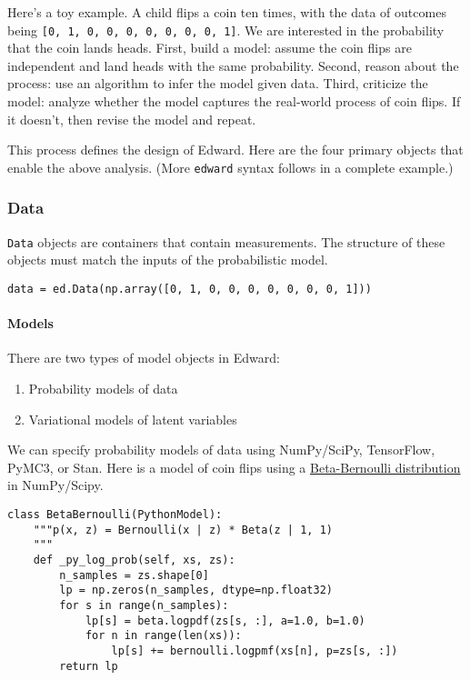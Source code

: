 Here's a toy example. A child flips a coin ten times, with the data of
outcomes being \texttt{{[}0,\ 1,\ 0,\ 0,\ 0,\ 0,\ 0,\ 0,\ 0,\ 1{]}}. We
are interested in the probability that the coin lands heads. First,
build a model: assume the coin flips are independent and land heads with
the same probability. Second, reason about the process: use an algorithm
to infer the model given data. Third, criticize the model: analyze
whether the model captures the real-world process of coin flips. If it
doesn't, then revise the model and repeat.

This process defines the design of Edward. Here are the four
primary objects that enable the above analysis. (More \texttt{edward}
syntax follows in a complete example.)

\subsubsection{Data}

\texttt{Data} objects are containers that contain measurements. The
structure of these objects must match the inputs of the probabilistic
model.

\begin{verbatim}
data = ed.Data(np.array([0, 1, 0, 0, 0, 0, 0, 0, 0, 1]))
\end{verbatim}

\paragraph{Models}\label{models}

There are two types of model objects in Edward:

\begin{enumerate}
\def\labelenumi{\arabic{enumi}.}
\tightlist
\item
  Probability models of data
\item
  Variational models of latent variables
\end{enumerate}

We can specify probability models of data using NumPy/SciPy, TensorFlow,
PyMC3, or Stan. Here is a model of coin flips using a
\href{https://en.wikipedia.org/wiki/Beta-binomial_distribution}{Beta-Bernoulli
distribution} in NumPy/Scipy.

\begin{verbatim}
class BetaBernoulli(PythonModel):
    """p(x, z) = Bernoulli(x | z) * Beta(z | 1, 1)
    """
    def _py_log_prob(self, xs, zs):
        n_samples = zs.shape[0]
        lp = np.zeros(n_samples, dtype=np.float32)
        for s in range(n_samples):
            lp[s] = beta.logpdf(zs[s, :], a=1.0, b=1.0)
            for n in range(len(xs)):
                lp[s] += bernoulli.logpmf(xs[n], p=zs[s, :])
        return lp
\end{verbatim}

